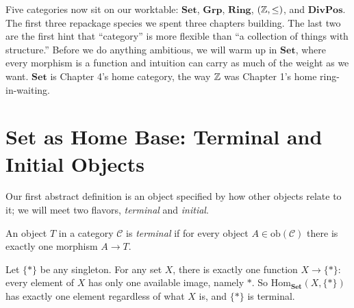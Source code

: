 \noindent Five categories now sit on our worktable: $\mathbf{Set}$,
$\mathbf{Grp}$, $\mathbf{Ring}$, $({\mathbb{Z}}, \leq)$, and $\mathbf{DivPos}$. The first
three repackage species we spent three chapters building. The last two are the
first hint that ``category'' is more flexible than ``a collection of things with
structure.'' Before we do anything ambitious, we will warm up in $\mathbf{Set}$,
where every morphism is a function and intuition can carry as much of the
weight as we want. $\mathbf{Set}$ is Chapter 4's home category, the way ${\mathbb{Z}}$ was
Chapter 1's home ring-in-waiting.

\section{Set as Home Base: Terminal and Initial Objects}\label{sec:set-home-base}
Our first abstract definition is an object specified by how other objects relate
to it; we will meet two flavors, \textit{terminal} and \textit{initial}.

\begin{definition}\label{def:terminal}
An object $T$ in a category $\mathcal{C}$ is \textit{terminal} if for every object $A \in
\mathrm{ob}(\mathcal{C})$ there is exactly one morphism $A \to T$.
\end{definition}

\begin{example}\label{ex:singleton-terminal}
Let $\{*\}$ be any singleton. For any set $X$, there is exactly one function
$X \to \{*\}$: every element of $X$ has only one available image, namely $*$. So
$\mathrm{Hom}_{\mathbf{Set}}(X, \{*\})$ has exactly one element regardless of
what $X$ is, and $\{*\}$ is terminal.
\end{example}

